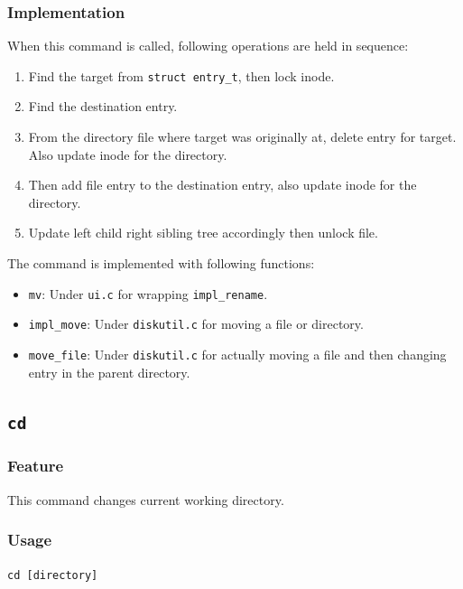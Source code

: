 \documentclass{homework}
\begin{document}
\subsubsection{Implementation}
When this command is called, following operations are held in sequence:
\begin{enumerate}
    \item Find the target from \texttt{struct entry_t}, then lock inode.
    \item Find the destination entry.
    \item From the directory file where target was originally at, delete entry for target. Also update inode for the directory.
    \item Then add file entry to the destination entry, also update inode for the directory.
    \item Update left child right sibling tree accordingly then unlock file.
\end{enumerate}

The command is implemented with following functions:
\begin{itemize}
    \item \texttt{mv}: Under \texttt{ui.c} for wrapping \texttt{impl_rename}.
    \item \texttt{impl_move}: Under \texttt{diskutil.c} for moving a file or directory.
    \item \texttt{move_file}: Under \texttt{diskutil.c} for actually moving a file and then changing entry in the parent directory.
\end{itemize}
\pagebreak

\subsection{\texttt{cd}}
\subsubsection{Feature}
This command changes current working directory.
\subsubsection{Usage}
\begin{center}
\texttt{cd [directory]}
\end{center}
\end{document}
